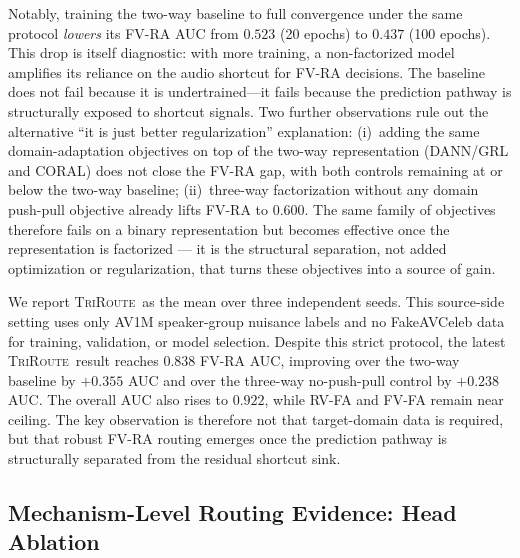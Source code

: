 \documentclass{article}
\newcommand{\method}{\textsc{TriRoute}}
\begin{document}
Notably, training the two-way baseline to full convergence under the same protocol \emph{lowers} its FV-RA AUC from $0.523$ (20 epochs) to $0.437$ (100 epochs). This drop is itself diagnostic: with more training, a non-factorized model amplifies its reliance on the audio shortcut for FV-RA decisions. The baseline does not fail because it is undertrained---it fails because the prediction pathway is structurally exposed to shortcut signals. Two further observations rule out the alternative ``it is just better regularization'' explanation: (i)~adding the same domain-adaptation objectives on top of the two-way representation (DANN/GRL and CORAL) does not close the FV-RA gap, with both controls remaining at or below the two-way baseline; (ii)~three-way factorization without any domain push-pull objective already lifts FV-RA to $0.600$. The same family of objectives therefore fails on a binary representation but becomes effective once the representation is factorized --- it is the structural separation, not added optimization or regularization, that turns these objectives into a source of gain.

We report \method\ as the mean over three independent seeds. This source-side setting uses only AV1M speaker-group nuisance labels and no FakeAVCeleb data for training, validation, or model selection. Despite this strict protocol, the latest \method\ result reaches $0.838$ FV-RA AUC, improving over the two-way baseline by $+0.355$ AUC and over the three-way no-push-pull control by $+0.238$ AUC. The overall AUC also rises to $0.922$, while RV-FA and FV-FA remain near ceiling. The key observation is therefore not that target-domain data is required, but that robust FV-RA routing emerges once the prediction pathway is structurally separated from the residual shortcut sink.

\subsection{Mechanism-Level Routing Evidence: Head Ablation}
\end{document}

